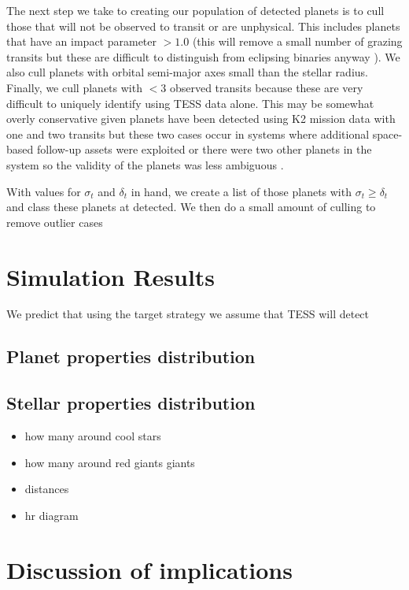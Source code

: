 \documentclass[iop,apj]{emulateapj}
\begin{document}
The next step we take to creating our population of detected planets is to cull those that will not be observed to transit or are unphysical. This includes planets that have an impact parameter $>1.0$ (this will remove a small number of grazing transits but these are difficult to distinguish from eclipsing binaries anyway \citep{someone}). We also cull planets with orbital semi-major axes small than the stellar radius. Finally, we cull planets with $<3$ observed transits because these are very difficult to uniquely identify using TESS data alone. This may be somewhat overly conservative given planets have been detected using K2 mission data \citep{howell14} with one \citep{vanderburg14} and two \citep{crossfield} transits but these two cases occur in systems where additional space-based follow-up assets were exploited or there were two other planets in the system so the validity of the planets was less ambiguous \citep{lissauer13}.

With values for $\sigma_t$ and $\delta_t$ in hand, we create a list of those planets with $\sigma_t\geq \delta_t$ and class these planets at detected. We then do a small amount of culling to remove outlier cases

\section{Simulation Results}
We predict that using the target strategy we assume that TESS will detect 

\subsection{Planet properties distribution}


\subsection{Stellar properties distribution}
\begin{itemize}
\item how many around cool stars
\item how many around red giants giants
\item distances
\item hr diagram
\end{itemize}


\section{Discussion of implications}
\end{document}
